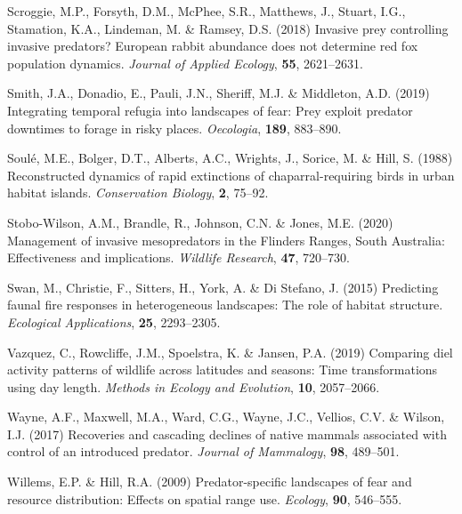 \documentclass[]{elsarticle} %
\begin{document}
\leavevmode\hypertarget{ref-scroggie2018invasive}{}%
Scroggie, M.P., Forsyth, D.M., McPhee, S.R., Matthews, J., Stuart, I.G., Stamation, K.A., Lindeman, M. \& Ramsey, D.S. (2018) Invasive prey controlling invasive predators? European rabbit abundance does not determine red fox population dynamics. \emph{Journal of Applied Ecology}, \textbf{55}, 2621--2631.

\leavevmode\hypertarget{ref-smith2019integrating}{}%
Smith, J.A., Donadio, E., Pauli, J.N., Sheriff, M.J. \& Middleton, A.D. (2019) Integrating temporal refugia into landscapes of fear: Prey exploit predator downtimes to forage in risky places. \emph{Oecologia}, \textbf{189}, 883--890.

\leavevmode\hypertarget{ref-soule1988reconstructed}{}%
Soulé, M.E., Bolger, D.T., Alberts, A.C., Wrights, J., Sorice, M. \& Hill, S. (1988) Reconstructed dynamics of rapid extinctions of chaparral-requiring birds in urban habitat islands. \emph{Conservation Biology}, \textbf{2}, 75--92.

\leavevmode\hypertarget{ref-stobo2020management}{}%
Stobo-Wilson, A.M., Brandle, R., Johnson, C.N. \& Jones, M.E. (2020) Management of invasive mesopredators in the Flinders Ranges, South Australia: Effectiveness and implications. \emph{Wildlife Research}, \textbf{47}, 720--730.

\leavevmode\hypertarget{ref-swan2015predicting}{}%
Swan, M., Christie, F., Sitters, H., York, A. \& Di Stefano, J. (2015) Predicting faunal fire responses in heterogeneous landscapes: The role of habitat structure. \emph{Ecological Applications}, \textbf{25}, 2293--2305.

\leavevmode\hypertarget{ref-vazquez2019comparing}{}%
Vazquez, C., Rowcliffe, J.M., Spoelstra, K. \& Jansen, P.A. (2019) Comparing diel activity patterns of wildlife across latitudes and seasons: Time transformations using day length. \emph{Methods in Ecology and Evolution}, \textbf{10}, 2057--2066.

\leavevmode\hypertarget{ref-wayne2017recoveries}{}%
Wayne, A.F., Maxwell, M.A., Ward, C.G., Wayne, J.C., Vellios, C.V. \& Wilson, I.J. (2017) Recoveries and cascading declines of native mammals associated with control of an introduced predator. \emph{Journal of Mammalogy}, \textbf{98}, 489--501.

\leavevmode\hypertarget{ref-willems2009predator}{}%
Willems, E.P. \& Hill, R.A. (2009) Predator-specific landscapes of fear and resource distribution: Effects on spatial range use. \emph{Ecology}, \textbf{90}, 546--555.
\end{document}
